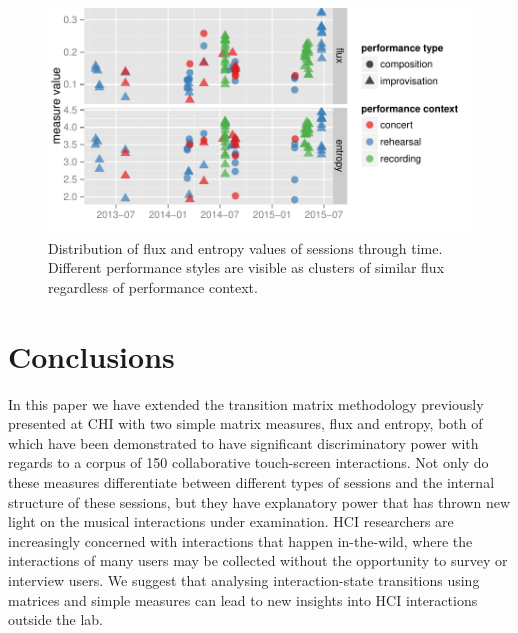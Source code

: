 \documentclass{sigchi}
\begin{document}
\begin{figure}
  \centering
  \includegraphics[width=\linewidth]{figures/flux-entropy-through-time}
  \caption{Distribution of flux and entropy values of sessions through time.
    Different performance styles are visible as clusters of similar
    flux regardless of performance context.
    \label{fig:flux-entropy-through-time}}
\end{figure}

\section{Conclusions}

In this paper we have extended the transition matrix methodology
previously presented at CHI with two simple matrix measures, flux and
entropy, both of which have been demonstrated to have significant
discriminatory power with regards to a corpus of 150 collaborative
touch-screen interactions. Not only do these measures differentiate
between different types of sessions and the internal structure of
these sessions, but they have explanatory power that has thrown new
light on the musical interactions under examination. HCI researchers
are increasingly concerned with interactions that happen in-the-wild,
where the interactions of many users may be collected without the
opportunity to survey or interview users. We suggest that analysing
interaction-state transitions using matrices and simple measures can
lead to new insights into HCI interactions outside the lab.


\end{document}
